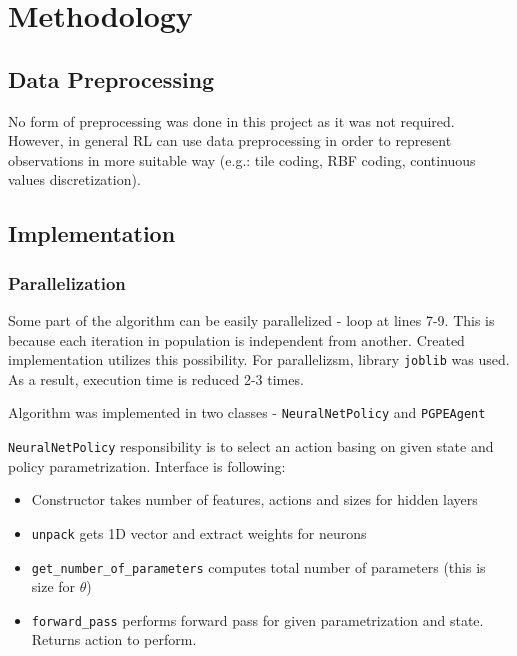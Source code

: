 \documentclass[12pt]{article}
\begin{document}
\section{Methodology}
\subsection{Data Preprocessing}

No form of preprocessing was done in this project as it was not required. However, in general RL can use data preprocessing in order to represent observations in more suitable way (e.g.: tile coding, RBF coding, continuous values discretization).

\subsection{Implementation}

\subsubsection{Parallelization}

Some part of the algorithm can be easily parallelized - loop at lines 7-9. This is because each iteration in population is independent from another. Created implementation utilizes this possibility. For parallelizsm, library \texttt{joblib} was used. As a result, execution time is reduced 2-3 times.

Algorithm was implemented in two classes - \texttt{NeuralNetPolicy} and \texttt{PGPEAgent}

\texttt{NeuralNetPolicy} responsibility is to select an action basing on given state and policy parametrization. Interface is following:

\begin{itemize}
\item  Constructor takes number of features, actions and sizes for hidden layers

\item \texttt{unpack} gets 1D vector and extract weights for neurons 

\item \texttt{get\_number\_of\_parameters} computes total number of parameters (this is size for $\theta$)

\item \texttt{forward\_pass} performs forward pass for given parametrization and state. Returns action to perform.
\end{itemize}
\end{document}
